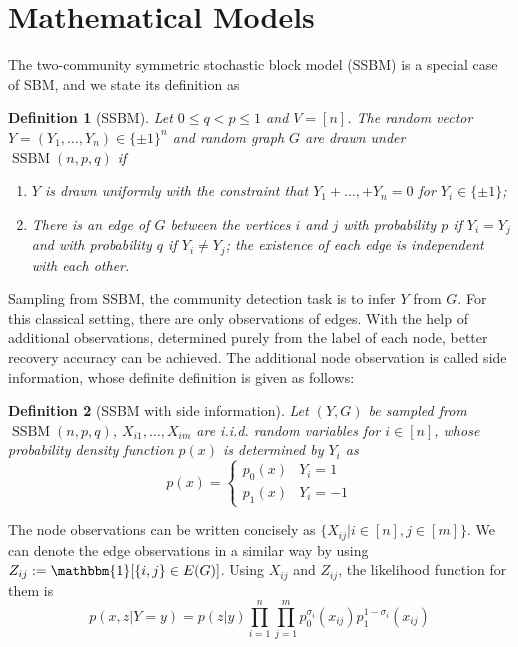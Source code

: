 \documentclass[conference]{IEEEtran}
\newtheorem{definition}{Definition}
\DeclareMathOperator{\SSBM}{SSBM}
\begin{document}
	\section{Mathematical Models}
	The two-community symmetric stochastic block model (SSBM) is a special case of SBM, and we state
	its definition as
	\begin{definition}[SSBM]
		Let $0\leq q<p\leq 1$ and $V=[n]$. The random vector $Y=(Y_1,\dots,Y_n)\in \{\pm 1\}^n$ and random graph $G$ are drawn under $\SSBM(n,p,q)$ if
		\begin{enumerate}
			\item $Y$ is drawn uniformly with the constraint that $Y_1 + \dots, + Y_n = 0$ for $Y_i \in \{\pm 1 \}$;
			
			\item There is an edge of $G$ between the vertices $i$ and $j$ with probability $p$ if $Y_i=Y_j$ and with probability $q$ if $Y_i \neq Y_j$; the existence of each edge is independent with each other.
		\end{enumerate}
	\end{definition}
	Sampling from SSBM, the community detection task is to infer $Y$ from $G$.
	For this classical setting, there are only observations of edges. With the help of
	additional observations, determined purely from the label of each node, better recovery
	accuracy can be achieved. The additional node observation is called side information, whose
	definite definition is given as follows:
	\begin{definition}[SSBM with side information]
		Let $(Y,G)$ be sampled from $\SSBM(n,p,q)$, $X_{i1}, \dots, X_{im}$ are i.i.d. random variables for $i \in [n]$,
		whose probability density function $p(x)$ is determined by $Y_i$ as
		\begin{equation}
		p(x) = \begin{cases}
		p_0(x) & Y_i = 1 \\
		p_1(x) & Y_i = -1
		\end{cases}
		\end{equation}
	\end{definition}
	The node observations can be written concisely as $\{X_{ij} | i \in [n], j \in [m]\}$.
	We can denote the edge observations in a similar way by using $Z_{ij}:=\mathbbm{1}[\{i,j\} \in E(G)]$.
	Using $X_{ij}$ and $Z_{ij}$, the likelihood function for them is
	\begin{equation}\label{eq:lh}
	p(x, z| Y=y) = p(z|y)\prod_{i=1}^n \prod_{j=1}^m p^{\sigma_i}_0(x_{ij})p^{1-\sigma_i}_1(x_{ij}) 
	\end{equation}
\end{document}
